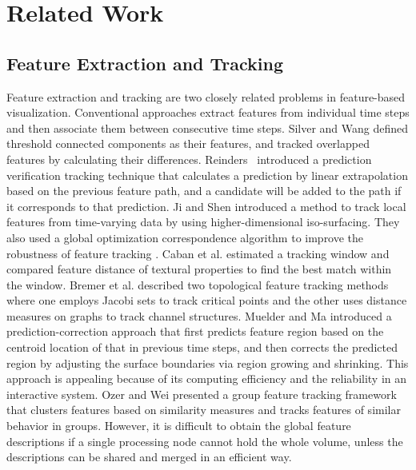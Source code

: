\section{Related Work}

\subsection{Feature Extraction and Tracking}

Feature extraction and tracking are two closely related problems in feature-based visualization. Conventional approaches extract features from individual time steps and then associate them between consecutive time steps. Silver and Wang \cite{Silver:1997:TVT:614266.614369} defined threshold connected components as their features, and tracked overlapped features by calculating their differences.
Reinders~\cite{Reinders2001} introduced a prediction verification tracking technique that calculates a prediction by linear extrapolation based on the previous feature path, and a candidate will be added to the path if it corresponds to that prediction. Ji and Shen \cite{Ji2003} introduced a method to track local features from time-varying data by using higher-dimensional iso-surfacing. They also used a global optimization correspondence algorithm to improve the robustness of feature tracking \cite{Ji2006}. Caban et al. \cite{Caban2007} estimated a tracking window and compared feature distance of textural properties to find the best match within the window. Bremer et al. \cite{Bremer2007} described two topological feature tracking methods where one employs Jacobi sets to track critical points and the other uses distance measures on graphs to track channel structures.
Muelder and Ma \cite{Muelder2009} introduced a prediction-correction approach that first predicts feature region based on the centroid location of that in previous time steps, and then corrects the predicted region by adjusting the surface boundaries via region growing and shrinking. This approach is appealing because of its computing efficiency and the reliability in an interactive system. Ozer and Wei presented a group feature tracking framework\cite{Ozer2012} that clusters features based on similarity measures and tracks features of similar behavior in groups. However, it is difficult to obtain the global feature descriptions if a single processing node cannot hold the whole volume, unless the descriptions can be shared and merged in an efficient way.

